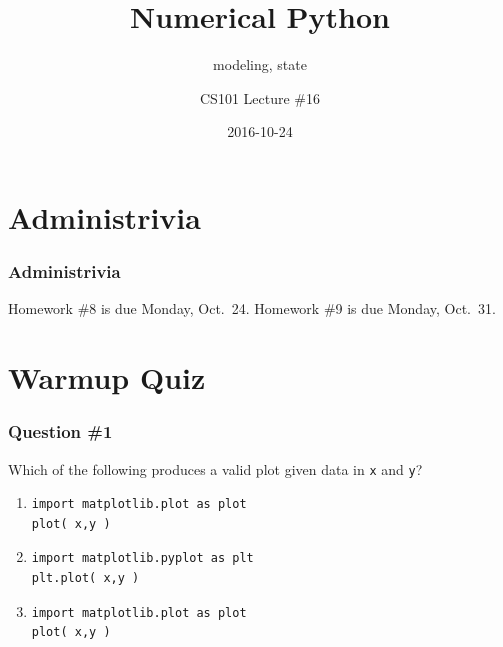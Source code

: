 \documentclass[11pt]{beamer}
\title{Numerical Python}
\subtitle{modeling, state}
\author{CS101 Lecture \#16}
\date{2016-10-24}
\begin{document}
  \setcounter{showProgressBar}{0}
  \setcounter{showSlideNumbers}{0}

\frame{\titlepage}

\setcounter{framenumber}{0}
\setcounter{showProgressBar}{1}
\setcounter{showSlideNumbers}{1}

\section{Administrivia}

\begin{frame}
  \frametitle{Administrivia}
  \Enlarge

  \begin{itemize}
  \myitem  Homework \#8 is due Monday, Oct.\ 24.
  \myitem  Homework \#9 is due Monday, Oct.\ 31.
  \end{itemize}
\end{frame}

\section{Warmup Quiz}

\begin{frame}[fragile]
  \frametitle{Question \#1}
  \Enlarge

  Which of the following produces a valid plot given data in \texttt{x} and \texttt{y}?

  \begin{enumerate}[label=\Alph*]
  \item
  \begin{Verbatim}
import matplotlib.plot as plot
plot( x,y )
  \end{Verbatim}
  \item
  \begin{Verbatim}
import matplotlib.pyplot as plt
plt.plot( x,y )
  \end{Verbatim}
  \item
  \begin{Verbatim}
import matplotlib.plot as plot
plot( x,y )
  \end{Verbatim}
  \end{enumerate}
\end{frame}
\end{document}
